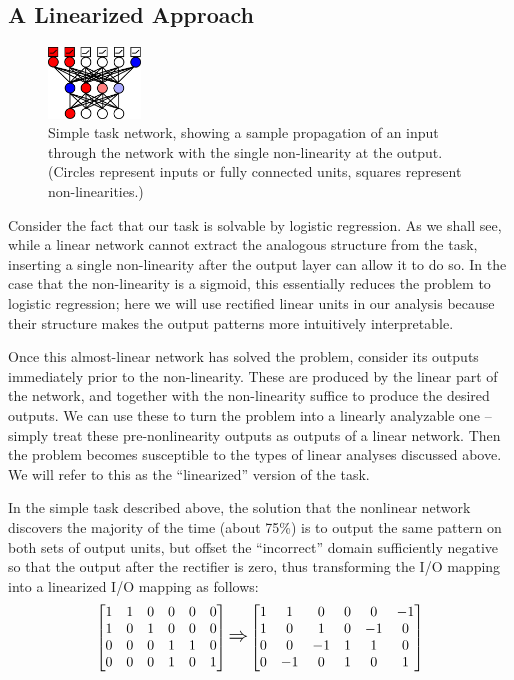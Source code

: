 \documentclass[10pt,letterpaper]{article}
\begin{document}
\subsection{A Linearized Approach}
\begin{figure}[p]
\centering
\includegraphics[width=0.22\textwidth]{figures/network_diagram.png}
\caption{Simple task network, showing a sample propagation of an input through the network with the single non-linearity at the output. (Circles represent inputs or fully connected units, squares represent non-linearities.) }
\label{network_diagram}
\end{figure}
Consider the fact that our task is solvable by logistic regression. As we shall see, while a linear network cannot extract the analogous structure from the task, inserting a single non-linearity after the output layer can allow it to do so. In the case that the non-linearity is a sigmoid, this essentially reduces the problem to logistic regression; here we will use rectified linear units in our analysis because their structure makes the output patterns more intuitively interpretable. \par 
Once this almost-linear network has solved the problem, consider its outputs immediately prior to the non-linearity. These are produced by the linear part of the network, and together with the non-linearity suffice to produce the desired outputs. We can use these to turn the problem into a linearly analyzable one -- simply treat these pre-nonlinearity outputs as outputs of a linear network. Then the problem becomes susceptible to the types of linear analyses discussed above. We will refer to this as the ``linearized'' version of the task. \par 
In the simple task described above, the solution that the nonlinear network discovers the majority of the time (about 75\%) is to output the same pattern on both sets of output units, but offset the ``incorrect'' domain sufficiently negative so that the output after the rectifier is zero, thus transforming the I/O mapping into a linearized I/O mapping as follows:
{ 
\[
\left[ \begin{matrix} 
1 & 1 & 0 & 0 & 0 & 0 \\
1 & 0 & 1 & 0 & 0 & 0 \\
 0 & 0 & 0 & 1 & 1 & 0\\
 0 & 0 & 0 & 1 & 0 & 1\\
\end{matrix}  \right] 
\mathlarger{\mathlarger{\Rightarrow}}
\left[ \begin{matrix} 
1 & 1 & 0 & 0 & 0 & -1 \\
1 & 0 & 1 & 0 & -1 & 0 \\
 0 & 0 & -1 & 1 & 1 & 0\\
 0 & -1 & 0 & 1 & 0 & 1\\
\end{matrix}  \right] 
\] }
\end{document}
